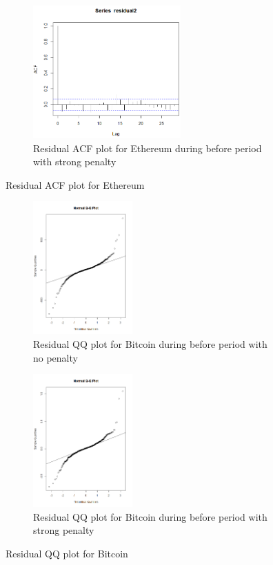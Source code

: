 \begin{spacing}{1.5}
\begin{figure}[h]
\begin{subfigure}{.49\textwidth}
\includegraphics[height=2in]{ethbefstrong.PNG}
\caption{ Residual ACF plot for Ethereum during before period with strong penalty
}
\end{subfigure}
\caption{Residual ACF plot for Ethereum}
\end{figure}




\begin{figure}[h]
  \begin{subfigure}{.49\textwidth}
    \centering
  \includegraphics[height=2in]{btcqqbefno.png}
  \caption{ Residual QQ plot for Bitcoin during before period with no penalty}
  \end{subfigure}
  \begin{subfigure}{.49\textwidth}
    \centering
  \includegraphics[height=2in]{btcqqbefstrong.png}
  \caption{ Residual QQ plot for Bitcoin during before period with strong penalty}
  \end{subfigure}
  \caption{Residual QQ plot for Bitcoin}
\end{figure}


\end{spacing}
